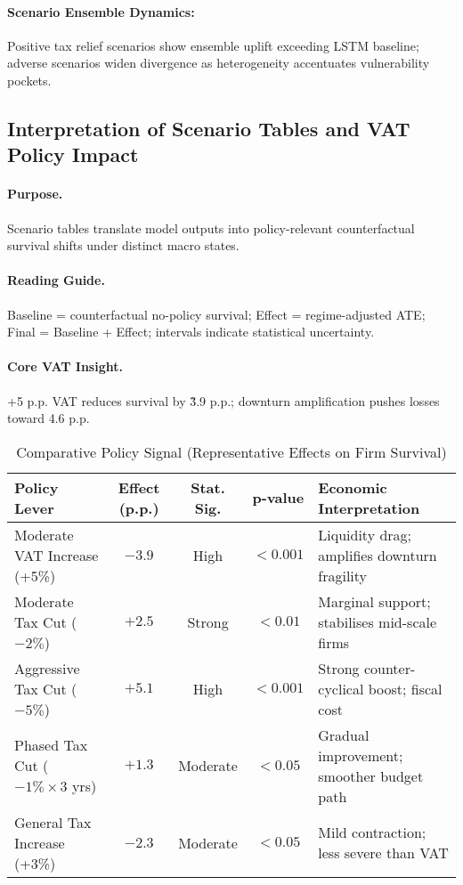 \paragraph{Scenario Ensemble Dynamics:} Positive tax relief scenarios show ensemble uplift exceeding LSTM baseline; adverse scenarios widen divergence as heterogeneity accentuates vulnerability pockets.

\subsection{Interpretation of Scenario Tables and VAT Policy Impact}
\paragraph{Purpose.} Scenario tables translate model outputs into policy-relevant counterfactual survival shifts under distinct macro states.

\paragraph{Reading Guide.} Baseline = counterfactual no-policy survival; Effect = regime-adjusted ATE; Final = Baseline + Effect; intervals indicate statistical uncertainty.

\paragraph{Core VAT Insight.} +5 p.p. VAT reduces survival by \~3.9 p.p.; downturn amplification pushes losses toward 4.6 p.p.

\begin{table}[htbp]
\centering
\small
\caption{Comparative Policy Signal (Representative Effects on Firm Survival)}
\label{tab:comparative_policy_signal}
\setlength{\tabcolsep}{4pt}
\renewcommand{\arraystretch}{1.1}
\begin{tabular}{|p{3.2cm}|c|c|c|p{3.6cm}|}
\hline
\textbf{Policy Lever} & \textbf{Effect (p.p.)} & \textbf{Stat. Sig.} & \textbf{p-value} & \textbf{Economic Interpretation} \\
\hline
Moderate VAT Increase (+5\%) & $-3.9$ & High & $<0.001$ & Liquidity drag; amplifies downturn fragility \\
\hline
Moderate Tax Cut ($-2\%$) & $+2.5$ & Strong & $<0.01$ & Marginal support; stabilises mid-scale firms \\
\hline
Aggressive Tax Cut ($-5\%$) & $+5.1$ & High & $<0.001$ & Strong counter-cyclical boost; fiscal cost \\
\hline
Phased Tax Cut ($-1\%\times3$ yrs) & $+1.3$ & Moderate & $<0.05$ & Gradual improvement; smoother budget path \\
\hline
General Tax Increase (+3\%) & $-2.3$ & Moderate & $<0.05$ & Mild contraction; less severe than VAT \\
\hline
\end{tabular}
\end{table}

